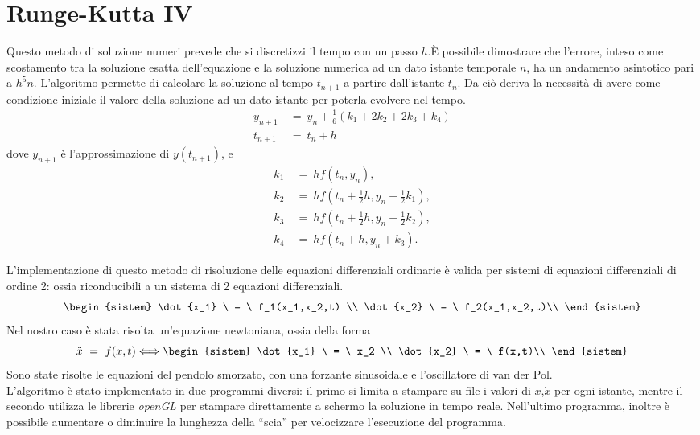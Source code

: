 \section{Runge-Kutta IV}

Questo metodo di soluzione numeri prevede che si discretizzi il tempo con un passo $h$.È possibile dimostrare che l'errore,
inteso come scostamento tra la soluzione esatta dell'equazione e la soluzione numerica ad un dato istante temporale $n$, ha un andamento asintotico
pari a $h^5 n$.
L'algoritmo permette di calcolare la soluzione al tempo $t_{n+1}$ a partire dall'istante $t_n$. Da ciò deriva la necessità di avere come condizione
iniziale il valore della soluzione ad un dato istante per poterla evolvere nel tempo.
\begin{align}
y_{n+1} \ &= \ y_n + \tfrac{1}{6} \left(k_1 + 2k_2 + 2k_3 + k_4 \right)\\
t_{n+1} \ &= \ t_n + h
\end{align}
dove $y_{n+1}$ è l'approssimazione di $y(t_{n+1})$, e
\begin{align}
k_1 \ &= \ hf(t_n, y_n),\\
k_2 \ &= \ hf(t_n + \tfrac{1}{2}h , y_n + \tfrac{1}{2} k_1),\\
k_3 \ &= \ hf(t_n + \tfrac{1}{2}h , y_n + \tfrac{1}{2} k_2),\\
k_4 \ &= \ hf(t_n + h , y_n + k_3).
\end{align}



L'implementazione di questo metodo di risoluzione delle equazioni differenziali ordinarie è valida
per sistemi di equazioni differenziali di ordine 2: ossia riconducibili a un sistema di 2 equazioni differenziali.\\
$$\begin{sistem}
	\dot{x_1} \ = \ f_1(x_1,x_2,t) \\
	\dot{x_2} \ = \ f_2(x_1,x_2,t)\\
  \end{sistem}
$$
Nel nostro caso è stata risolta un'equazione newtoniana, ossia della forma
$$
	\ddot{x} \ = \ f(x,t) \Longleftrightarrow  
	\begin{sistem}
	\dot{x_1} \ = \ x_2 \\
	\dot{x_2} \ = \ f(x,t)\\
	\end{sistem}
$$
Sono state risolte le equazioni del pendolo smorzato, con una forzante sinusoidale e l'oscillatore di van der Pol.\\
L'algoritmo è stato implementato in due programmi diversi: il primo si limita a stampare su file i valori di $x$,$\dot x$ per ogni istante, mentre
il secondo utilizza le librerie \emph{openGL} per stampare direttamente a schermo la soluzione in tempo reale.
Nell'ultimo programma, inoltre è possibile aumentare o diminuire la lunghezza della ``scia'' per velocizzare l'esecuzione del programma.
